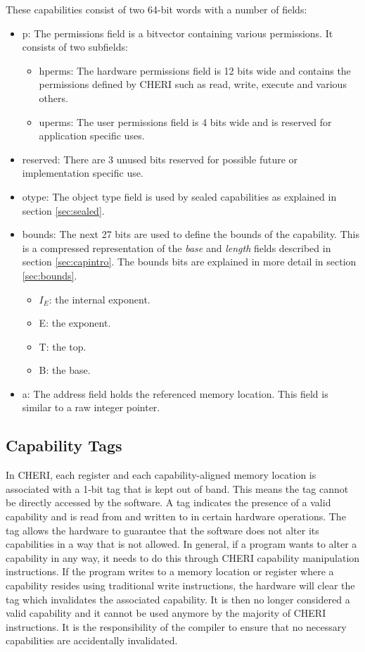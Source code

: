 These capabilities consist of two 64-bit words with a number of fields:

\begin{itemize}
    \item p: The permissions field is a bitvector containing various permissions. It consists of two subfields:
        \begin{itemize}
            \item hperms: The hardware permissions field is 12 bits wide and contains the permissions defined by CHERI such as read, write, execute and various others.
            \item uperms: The user permissions field is 4 bits wide and is reserved for application specific uses.
        \end{itemize}
    \item reserved: There are 3 unused bits reserved for possible future or implementation specific use.
    \item otype: The object type field is used by sealed capabilities as explained in section \ref{sec:sealed}.
    \item bounds: The next 27 bits are used to define the bounds of the capability. This is a compressed representation of the \textit{base} and \textit{length} fields described in section \ref{sec:capintro}. The bounds bits are explained in more detail in section \ref{sec:bounds}.
        \begin{itemize}
            \item $I_E$: the internal exponent.
            \item E: the exponent.
            \item T: the top.
            \item B: the base.
        \end{itemize}
    \item a: The address field holds the referenced memory location. This field is similar to a raw integer pointer.
\end{itemize}

\subsection{Capability Tags}
In CHERI, each register and each capability-aligned memory location is associated with a 1-bit tag that is kept out of band. This means the tag cannot be directly accessed by the software. A tag indicates the presence of a valid capability and is read from and written to in certain hardware operations. The tag allows the hardware to guarantee that the software does not alter its capabilities in a way that is not allowed. In general, if a program wants to alter a capability in any way, it needs to do this through CHERI capability manipulation instructions. If the program writes to a memory location or register where a capability resides using traditional write instructions, the hardware will clear the tag which invalidates the associated capability. It is then no longer considered a valid capability and it cannot be used anymore by the majority of CHERI instructions. It is the responsibility of the compiler to ensure that no necessary capabilities are accidentally invalidated. 


